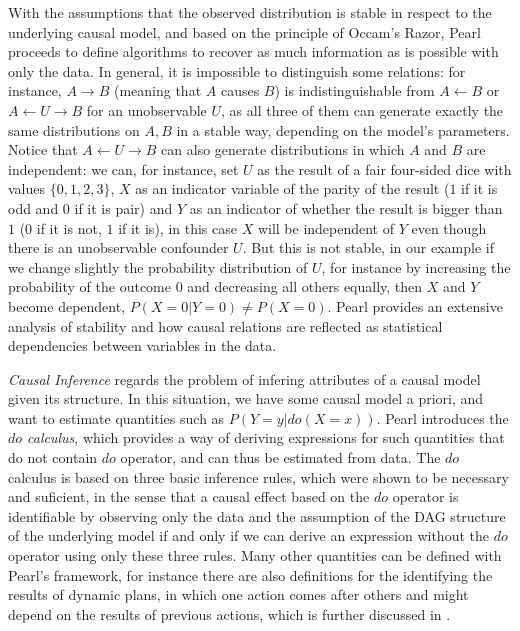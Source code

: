 With the assumptions that the observed distribution is stable in respect to the underlying causal model, and based on the principle of Occam's Razor, Pearl proceeds to define algorithms to recover as much information as is possible with only the data. In general, it is impossible to distinguish some relations: for instance, $A \rightarrow B$ (meaning that $A$ causes $B$) is indistinguishable from $A \leftarrow B$ or $A \leftarrow U \rightarrow B$ for an unobservable $U$, as all three of them can generate exactly the same distributions on $A,B$ in a stable way, depending on the model's parameters. Notice that $A \leftarrow U \rightarrow B$ can also generate distributions in which $A$ and $B$ are independent: we can, for instance, set $U$ as the result of a fair four-sided dice with values $\{0,1,2,3\}$, $X$ as an indicator variable of the parity of the result ($1$ if it is odd and $0$ if it is pair) and $Y$ as an indicator of whether the result is bigger than $1$ ($0$ if it is not, $1$ if it is), in this case $X$ will be independent of $Y$ even though there is an unobservable confounder $U$. But this is not stable, in our example if we change slightly the probability distribution of $U$, for instance by increasing the probability of the outcome $0$ and decreasing all others equally, then $X$ and $Y$ become dependent, $P(X=0|Y=0) \neq P(X=0)$. Pearl provides an extensive analysis of stability and how causal relations are reflected as statistical dependencies between variables in the data.

\emph{Causal Inference} regards the problem of infering attributes of a causal model given its structure. In this situation, we have some causal model a priori, and want to estimate quantities such as $P(Y=y|do(X=x))$. Pearl introduces the \emph{$do$ calculus}, which provides a way of deriving expressions for such quantities that do not contain $do$ operator, and can thus be estimated from data. The $do$ calculus is based on three basic inference rules, which were shown to be necessary and suficient, in the sense that a causal effect based on the $do$ operator is identifiable by observing only the data and the assumption of the DAG structure of the underlying model if and only if we can derive an expression without the $do$ operator using only these three rules. Many other quantities can be defined with Pearl's framework, for instance there are also definitions for the identifying the results of dynamic plans, in which one action comes after others and might depend on the results of previous actions, which is further discussed in \cite[Section~4.4]{Causality}. 

